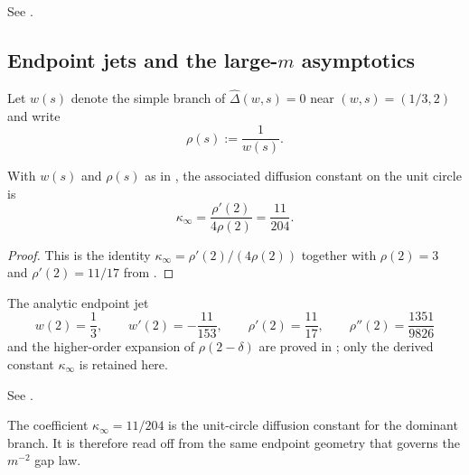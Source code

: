 \begin{corollary}[The worst twist $m=2$]
  \label{cor:rho-m2-closed-form}
  See \cite[Corollary~3.12]{MaZhang2026SelfDualKernel}.
\end{corollary}

\subsection{Endpoint jets and the large-\texorpdfstring{$m$}{m} asymptotics}

Let $w(s)$ denote the simple branch of $\widehat\Delta(w,s)=0$ near
$(w,s)=(1/3,2)$ and write
\[
  \rho(s):=\frac{1}{w(s)}.
\]

\begin{proposition}
  \label{prop:sync-endpoint-jet}
  With \(w(s)\) and \(\rho(s)\) as in
  \cite[Proposition~3.13]{MaZhang2026SelfDualKernel}, the associated
  diffusion constant on the unit circle is
  \[
    \kappa_\infty=\frac{\rho'(2)}{4\rho(2)}=\frac{11}{204}.
  \]
\end{proposition}

\begin{proof}
  This is the identity \(\kappa_\infty=\rho'(2)/(4\rho(2))\) together
  with \(\rho(2)=3\) and \(\rho'(2)=11/17\) from
  \cite[Proposition~3.13]{MaZhang2026SelfDualKernel}.
\end{proof}

\begin{remark}
  The analytic endpoint jet
  \[
    w(2)=\frac13,\qquad
    w'(2)=-\frac{11}{153},\qquad
    \rho'(2)=\frac{11}{17},\qquad
    \rho''(2)=\frac{1351}{9826}
  \]
  and the higher-order expansion of \(\rho(2-\delta)\) are proved in
  \cite[Proposition~3.13]{MaZhang2026SelfDualKernel}; only the derived
  constant \(\kappa_\infty\) is retained here.
\end{remark}

\begin{theorem}
  \label{thm:rho-gap-m12}
  See \cite[Theorem~3.15]{MaZhang2026SelfDualKernel}.
\end{theorem}

\begin{remark}
  The coefficient $\kappa_\infty=11/204$ is the unit-circle diffusion
  constant for the dominant branch. It is therefore read off from the
  same endpoint geometry that governs the $m^{-2}$ gap law.
\end{remark}


